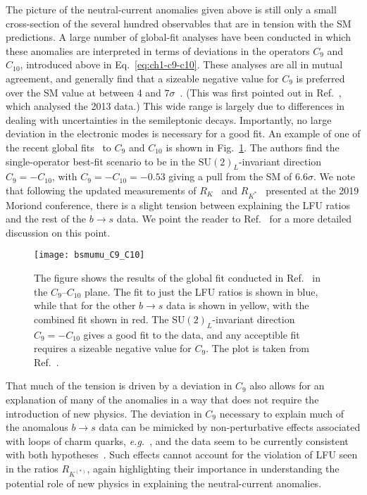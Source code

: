 The picture of the neutral-current anomalies given above is still only a small
cross-section of the several hundred observables that are in tension with the SM
predictions. A large number of global-fit analyses have been conducted in which
these anomalies are interpreted in terms of deviations in the operators $C_{9}$
and $C_{10}$, introduced above in Eq.~\eqref{eq:ch1-c9-c10}. These analyses are all
in mutual agreement, and generally find that a sizeable negative value for
$C_{9}$ is preferred over the SM value at between 4 and
$7\sigma$~\cite{Aebischer:2019mlg, Alguero:2019ptt, Arbey:2019duh,
  Ciuchini:2019usw}. (This was first pointed out in
Ref.~\cite{Descotes-Genon:2013wba}, which analysed the 2013 data.) This wide
range is largely due to differences in dealing with uncertainties in the
semileptonic decays. Importantly, no large deviation in the electronic modes is
necessary for a good fit. An example of one of the recent global
fits~\cite{Aebischer:2019mlg} to $C_{9}$ and $C_{10}$ is shown in
Fig.~\ref{fig:ch1-c9-c10-fit}. The authors find the single-operator best-fit
scenario to be in the $\mathrm{SU}(2)_{L}$-invariant direction
$C_{9} = -C_{10}$, with $C_{9} = -C_{10} = -0.53$ giving a pull from the SM of
$6.6\sigma$. We note that following the updated measurements of
$R_{K}$~\cite{Aaij:2019wad} and $R_{K^{*}}$~\cite{Abdesselam:2019wac} presented
at the 2019 Moriond conference, there is a slight tension between explaining the
LFU ratios and the rest of the $b\to s$ data. We point the reader to
Ref.~\cite{Aebischer:2019mlg} for a more detailed discussion on this point.

\begin{figure}[t]
  \centering
  \texttt{[image: bsmumu\_C9\_C10]}
  \caption[The figure shows the results of the global fit conducted in
  Ref.~\cite{Aebischer:2019mlg} in the $C_{9}$--$C_{10}$ plane.]{The figure
    shows the results of the global fit conducted in
    Ref.~\cite{Aebischer:2019mlg} in the $C_{9}$--$C_{10}$ plane. The fit to
    just the LFU ratios is shown in blue, while that for the other $b\to s$ data
    is shown in yellow, with the combined fit shown in red. The
    $\mathrm{SU}(2)_{L}$-invariant direction $C_{9}=-C_{10}$ gives a good fit to
    the data, and any acceptible fit requires a sizeable negative value for
    $C_{9}$. The plot is taken from Ref.~\cite{Aebischer:2019mlg}.}
  \label{fig:ch1-c9-c10-fit}
\end{figure}

That much of the tension is driven by a deviation in $C_{9}$ also allows for an
explanation of many of the anomalies in a way that does not require the
introduction of new physics. The deviation in $C_{9}$ necessary to explain much
of the anomalous $b \to s$ data can be mimicked by non-perturbative effects
associated with loops of charm quarks, \textit{e.g.}~\cite{Blake:2017wjz}, and
the data seem to be currently consistent with both
hypotheses~\cite{Altmannshofer:2015sma, Descotes-Genon:2015uva}. Such effects
cannot account for the violation of LFU seen in the ratios $R_{K^{(*)}}$, again
highlighting their importance in understanding the potential role of new physics
in explaining the neutral-current anomalies.

